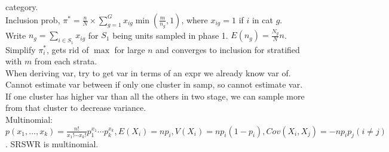 \documentclass[landscape]{article}
\begin{document}
\begin{multicols*}{3}
category.
\\ Inclusion prob, $\pi^* = \frac{n}{N} \times \sum_{g=1}^G x_{ig}
\min \left(\frac{m}{n_g},1\right)$, where $x_{ig} = 1$ if $i$ in cat
$g$.
\\ Write $n_g = \sum_{i \in S_1}x_{ig}$ for $S_1$ being units sampled
in phase 1. $E(n_g) = \frac{N_{g}}{N}n$. Simplify $\pi_i^*$, gets rid
of $\max$ for large $n$ and converges to inclusion for stratified with
$m$ from each strata.
\\ When deriving var, try to get var in terms of an expr we already
know var of.
\\ Cannot estimate var between if only one cluster in samp, so cannot
estimate var.
\\ If one cluster has higher var than all the others in two stage, we
can sample more from that cluster to decrease variance.
\\ Multinomial: $p(x_1, \ldots, x_k) = \frac{n!}{x_1!\cdots
  x_k!}p_1^{x_1}\cdots p_k^{x_k}, E(X_i) = np_i, V(X_i) = np_i
(1-p_i), Cov(X_i, X_j) = -np_ip_j (i \neq j)$. SRSWR is multinomial.
\end{multicols*}
\end{document}

